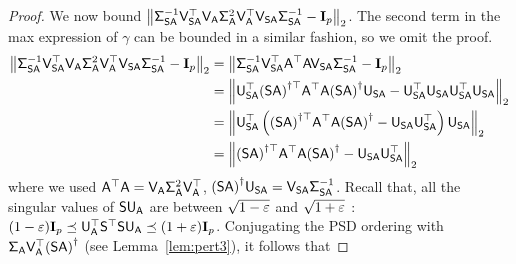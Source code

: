 \begin{proof}
We now bound
$\norm{\matSig_{\matS\matA}^{-1} \matV_{\matS\matA}^\top \matV_{\matA} \matSig_{\matA}^2 \matV_{\matA}^\top \matV_{\matS\matA} \matSig_{\matS\matA}^{-1} - \matI_p}$.
The second term in the max expression of $\gamma$ can be bounded in a similar fashion, so we omit the proof.
\begin{align*}
	 \norm{\matSig_{\matS\matA}^{-1} \matV_{\matS\matA}^\top \matV_{\matA} \matSig_{\matA}^2 \matV_{\matA}^\top \matV_{\matS\matA} \matSig_{\matS\matA}^{-1} - \matI_p}
	& =  \norm{\matSig_{\matS\matA}^{-1} \matV_{\matS\matA}^\top \matA^\top\matA  \matV_{\matS\matA} \matSig_{\matS\matA}^{-1} - \matI_p}\\
	& =  \norm{ \matU_{\matS\matA}^\top \tpinv{(\matS\matA)} \matA^\top \matA  \pinv{(\matS\matA )} \matU_{\matS\matA}
     -   \matU_{\matS \matA}^\top \matU_{\matS \matA}\matU_{\matS \matA}^\top \matU_{\matS \matA}}\\
	& =  \norm{ \matU_{\matS\matA}^\top \left( \tpinv{(\matS\matA)} \matA^\top \matA  \pinv{(\matS\matA )} - \matU_{\matS \matA} \matU_{\matS \matA}^\top\right) \matU_{\matS\matA}}\\
	& =  \norm{\tpinv{(\matS\matA)} \matA^\top \matA  \pinv{(\matS\matA )} - \matU_{\matS \matA} \matU_{\matS \matA}^\top}
\end{align*}
where we used $\matA^\top \matA = \matV_{\matA} \matSig_{\matA}^2 \matV_{\matA}^\top$, $\pinv{(\matS\matA )} \matU_{\matS\matA} = \matV_{\matS\matA} \matSig_{\matS\matA}^{-1}$.
Recall that, all the singular values of $\matS \matU_{\matA}$ are between $\sqrt{1 - \eps}$ and $\sqrt{1 + \eps}$ : $ (1-\eps) \matI_p \preceq \matU_{\matA}^\top \matS^\top \matS \matU_{\matA} \preceq (1+\eps ) \matI_p$.
Conjugating the PSD ordering with $\matSig_{\matA} \matV_{\matA}^\top\pinv{(\matS \matA)}$ (see Lemma~\ref{lem:pert3}), it follows that

\end{proof}
